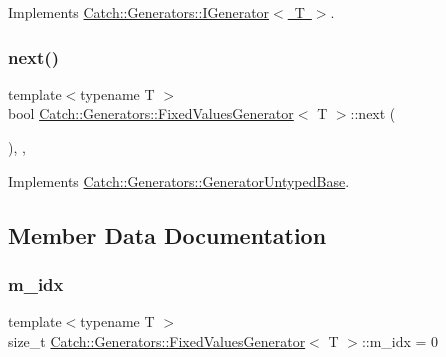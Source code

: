 Implements \mbox{\hyperlink{struct_catch_1_1_generators_1_1_i_generator_a525d381fc9249a885b075a0632a8579a}{Catch\+::\+Generators\+::\+I\+Generator$<$ T $>$}}.

\mbox{\label{class_catch_1_1_generators_1_1_fixed_values_generator_a6ce9e3ed045239c7b82873f24bd9cd3b}} 
\subsubsection{\texorpdfstring{next()}{next()}}
{\footnotesize\ttfamily template$<$typename T $>$ \\
bool \mbox{\hyperlink{class_catch_1_1_generators_1_1_fixed_values_generator}{Catch\+::\+Generators\+::\+Fixed\+Values\+Generator}}$<$ T $>$\+::next (\begin{DoxyParamCaption}{ }\end{DoxyParamCaption})\hspace{0.3cm}{\ttfamily [inline]}, {\ttfamily [override]}, {\ttfamily [virtual]}}



Implements \mbox{\hyperlink{class_catch_1_1_generators_1_1_generator_untyped_base_aeed3c0cd6233c5f553549e453b8d6638}{Catch\+::\+Generators\+::\+Generator\+Untyped\+Base}}.



\subsection{Member Data Documentation}
\mbox{\label{class_catch_1_1_generators_1_1_fixed_values_generator_a14c3c77deb624c09065e5ccaf8646f33}} 
\subsubsection{\texorpdfstring{m\_idx}{m\_idx}}
{\footnotesize\ttfamily template$<$typename T $>$ \\
size\+\_\+t \mbox{\hyperlink{class_catch_1_1_generators_1_1_fixed_values_generator}{Catch\+::\+Generators\+::\+Fixed\+Values\+Generator}}$<$ T $>$\+::m\+\_\+idx = 0\hspace{0.3cm}{\ttfamily [private]}}

